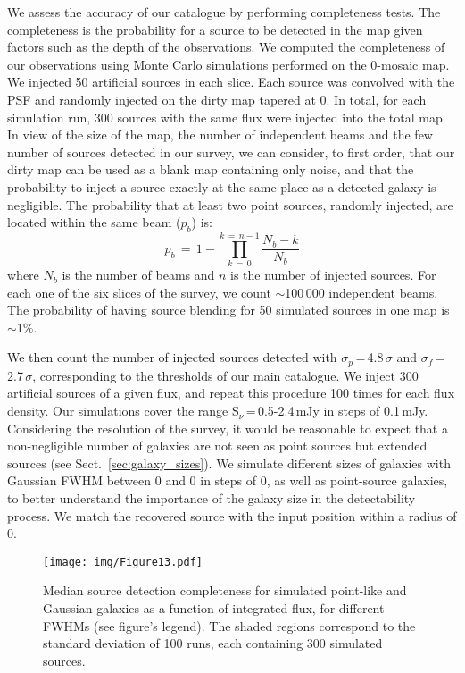 \documentclass[longauth]{aa}
\begin{document}
We assess the accuracy of our catalogue by performing completeness tests. The completeness is the probability for a source to be detected in the map given factors such as the depth of the observations. We computed the completeness of our observations using Monte Carlo simulations performed on the 0-mosaic map. We injected 50 artificial sources in each slice. Each source was convolved with the PSF and randomly injected on the dirty map tapered at 0. In total, for each simulation run, 300 sources with the same flux were injected into the total map. In view of the size of the map, the number of independent beams and the few number of sources detected in our survey, we can consider, to first order, that our dirty map can be used as a blank map containing only noise, and that the probability to inject a source exactly at the same place as a detected galaxy is negligible. The probability that at least two point sources, randomly injected, are located within the same beam ($p_b$) is:
\begin{equation}
p_b\,=\,1- \prod_{k\,=\,0}^{k\,=\,n - 1} \frac{N_b - k}{N_b}
\end{equation}
\noindent where $N_b$ is the number of beams and $n$ is the number of injected sources. For each one of the six slices of the survey, we count $\sim$100\,000 independent beams. The probability of having source blending for 50 simulated sources in one map is $\sim$1\%.

We then count the number of injected sources detected with $\sigma_p$\,=\,4.8\,$\sigma$ and  $\sigma_f$\,=\,2.7\,$\sigma$, corresponding to the thresholds of our main catalogue. We inject 300 artificial sources of a given flux, and repeat this procedure 100 times for each flux density. Our simulations cover the range S$_\nu$\,=\,0.5-2.4\,mJy in steps of 0.1\,mJy. Considering the resolution of the survey, it would be reasonable to expect that a non-negligible number of galaxies are not seen as point sources but extended sources (see Sect.~\ref{sec:galaxy_sizes}). We simulate different sizes of galaxies with Gaussian FWHM between 0 and 0 in steps of 0, as well as point-source galaxies, to better understand the importance of the galaxy size in the detectability process. We match the recovered source with the input position within a radius of 0. 


   \begin{figure}
   \centering
   \texttt{[image: img/Figure13.pdf]}
      \caption{Median source detection completeness for simulated point-like and Gaussian galaxies as a function of integrated flux, for different FWHMs (see figure's legend). The shaded regions correspond to the standard deviation of 100 runs, each containing 300 simulated sources.}
         \label{Completeness}
   \end{figure}
\end{document}
